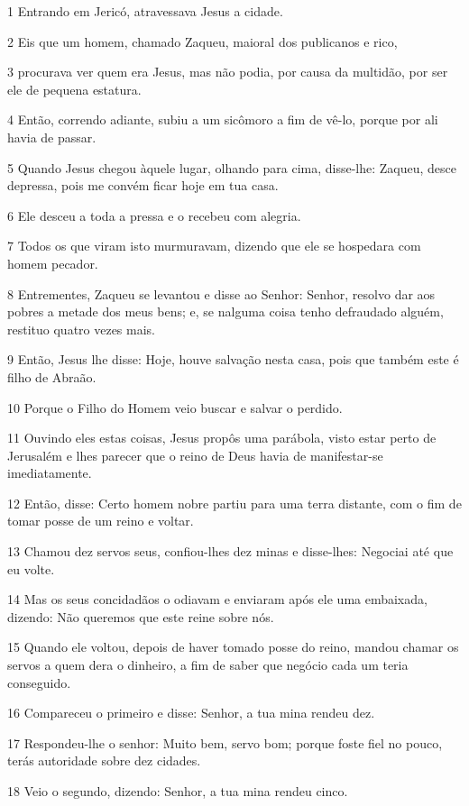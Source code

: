 \par 1 Entrando em Jericó, atravessava Jesus a cidade.
\par 2 Eis que um homem, chamado Zaqueu, maioral dos publicanos e rico,
\par 3 procurava ver quem era Jesus, mas não podia, por causa da multidão, por ser ele de pequena estatura.
\par 4 Então, correndo adiante, subiu a um sicômoro a fim de vê-lo, porque por ali havia de passar.
\par 5 Quando Jesus chegou àquele lugar, olhando para cima, disse-lhe: Zaqueu, desce depressa, pois me convém ficar hoje em tua casa.
\par 6 Ele desceu a toda a pressa e o recebeu com alegria.
\par 7 Todos os que viram isto murmuravam, dizendo que ele se hospedara com homem pecador.
\par 8 Entrementes, Zaqueu se levantou e disse ao Senhor: Senhor, resolvo dar aos pobres a metade dos meus bens; e, se nalguma coisa tenho defraudado alguém, restituo quatro vezes mais.
\par 9 Então, Jesus lhe disse: Hoje, houve salvação nesta casa, pois que também este é filho de Abraão.
\par 10 Porque o Filho do Homem veio buscar e salvar o perdido.
\par 11 Ouvindo eles estas coisas, Jesus propôs uma parábola, visto estar perto de Jerusalém e lhes parecer que o reino de Deus havia de manifestar-se imediatamente.
\par 12 Então, disse: Certo homem nobre partiu para uma terra distante, com o fim de tomar posse de um reino e voltar.
\par 13 Chamou dez servos seus, confiou-lhes dez minas e disse-lhes: Negociai até que eu volte.
\par 14 Mas os seus concidadãos o odiavam e enviaram após ele uma embaixada, dizendo: Não queremos que este reine sobre nós.
\par 15 Quando ele voltou, depois de haver tomado posse do reino, mandou chamar os servos a quem dera o dinheiro, a fim de saber que negócio cada um teria conseguido.
\par 16 Compareceu o primeiro e disse: Senhor, a tua mina rendeu dez.
\par 17 Respondeu-lhe o senhor: Muito bem, servo bom; porque foste fiel no pouco, terás autoridade sobre dez cidades.
\par 18 Veio o segundo, dizendo: Senhor, a tua mina rendeu cinco.
